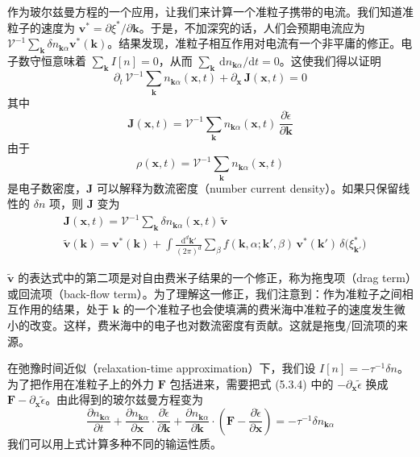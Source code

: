 作为玻尔兹曼方程的一个应用，让我们来计算一个准粒子携带的电流。我们知道准粒子的速度为 $\pmb{v}^{*} = \partial\xi^{*}/\partial\pmb{k}$。于是，不加深究的话，人们会预期电流应为 $\mathcal{V}^{-1}\sum_{\pmb{k}} \delta n_{\pmb{k}\alpha} \pmb{v}^{*}(\pmb{k})$。结果发现，准粒子相互作用对电流有一个非平庸的修正。电子数守恒意味着 $\sum_{\pmb{k}} I[n] = 0$，从而 $\sum_{\pmb{k}}\,\mathrm{d}n_{\pmb{k}\alpha}/\mathrm{d}t = 0$。这使我们得以证明
\begin{equation*}
\partial_t\, \mathcal{V}^{-1} \sum_{\pmb{k}} n_{\pmb{k}\alpha}(\pmb{x},t) + \partial_{\pmb{x}}\, \pmb{J}(\pmb{x},t) = 0
\end{equation*}
其中
\begin{equation*}
\pmb{J}(\pmb{x},t) = \mathcal{V}^{-1} \sum_{\pmb{k}} n_{\pmb{k}\alpha}(\pmb{x},t)\, \frac{\partial \tilde{\epsilon}}{\partial \pmb{k}} \tag{5.3.5}
\end{equation*}
由于
\begin{equation*}
\rho(\pmb{x},t) = \mathcal{V}^{-1} \sum_{\pmb{k}} n_{\pmb{k}\alpha}(\pmb{x},t)
\end{equation*}
是电子数密度，$\pmb{J}$ 可以解释为数流密度（number current density）。如果只保留线性的 $\delta n$ 项，则 $\pmb{J}$ 变为
\begin{align*}
&\pmb{J}(\pmb{x},t) = \mathcal{V}^{-1} \sum_{\pmb{k}} \delta n_{\pmb{k}\alpha}(\pmb{x},t)\, \tilde{\pmb{v}}\\
&\tilde{\pmb{v}}(\pmb{k}) = \pmb{v}^{*}(\pmb{k}) + \int \frac{\mathrm{d}^{d}\pmb{k}'}{(2\pi)^{d}} \sum_{\beta} f(\pmb{k},\alpha;\pmb{k}',\beta)\, \pmb{v}^{*}(\pmb{k}')\, \delta\big( \xi^{*}_{\pmb{k}'} \big) \tag{5.3.6}
\end{align*}

$\tilde{\pmb{v}}$ 的表达式中的第二项是对自由费米子结果的一个修正，称为拖曳项（drag term）或回流项（back-flow term）。为了理解这一修正，我们注意到：作为准粒子之间相互作用的结果，处于 $\pmb{k}$ 的一个准粒子也会使填满的费米海中准粒子的速度发生微小的改变。这样，费米海中的电子也对数流密度有贡献。这就是拖曳/回流项的来源。

在弛豫时间近似（relaxation-time approximation）下，我们设 $I[n] = -\tau^{-1}\delta n$。为了把作用在准粒子上的外力 $\pmb{F}$ 包括进来，需要把式 (5.3.4) 中的 $-\partial_{\pmb{x}}\tilde{\epsilon}$ 换成 $\pmb{F} - \partial_{\pmb{x}}\tilde{\epsilon}$。由此得到的玻尔兹曼方程变为
\begin{equation*}
\frac{\partial n_{\pmb{k}\alpha}}{\partial t} + \frac{\partial n_{\pmb{k}\alpha}}{\partial \pmb{x}} \cdot \frac{\partial \tilde{\epsilon}}{\partial \pmb{k}} + \frac{\partial n_{\pmb{k}\alpha}}{\partial \pmb{k}} \cdot \left( \pmb{F} - \frac{\partial \tilde{\epsilon}}{\partial \pmb{x}} \right) = -\tau^{-1} \delta n_{\pmb{k}\alpha} \tag{5.3.7}
\end{equation*}
我们可以用上式计算多种不同的输运性质。

